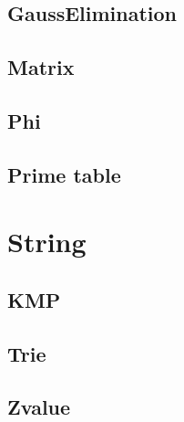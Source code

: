 \subsection{GaussElimination}

\subsection{Matrix}

\subsection{Phi}

\subsection{Prime table}


\section{String}

\subsection{KMP}

\subsection{Trie}

\subsection{Zvalue}
